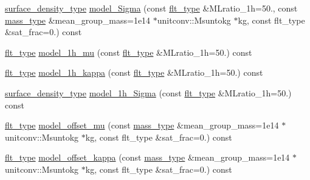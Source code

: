 \begin{DoxyCompactItemize}
\item 
\hyperlink{namespaceIceBRG_a80c597ef5ba0a32491d32a9f0083b02d}{surface\-\_\-density\-\_\-type} \hyperlink{classIceBRG_1_1pair__bin__summary_a1627a07bc392e0a876f5257b5b614622}{model\-\_\-\-Sigma} (const \hyperlink{lib_2IceBRG__main_2common_8h_ad0f130a56eeb944d9ef2692ee881ecc4}{flt\-\_\-type} \&M\-Lratio\-\_\-1h=50., const \hyperlink{namespaceIceBRG_a1be72ac4918a9b029f2eefa084213e35}{mass\-\_\-type} \&mean\-\_\-group\-\_\-mass=1e14 $\ast$unitconv\-::\-Msuntokg $\ast$kg, const flt\-\_\-type \&sat\-\_\-frac=0.) const 
\item 
\hyperlink{lib_2IceBRG__main_2common_8h_ad0f130a56eeb944d9ef2692ee881ecc4}{flt\-\_\-type} \hyperlink{classIceBRG_1_1pair__bin__summary_a1acf154add21e045b2b58cce9eeb0a14}{model\-\_\-1h\-\_\-mu} (const \hyperlink{lib_2IceBRG__main_2common_8h_ad0f130a56eeb944d9ef2692ee881ecc4}{flt\-\_\-type} \&M\-Lratio\-\_\-1h=50.) const 
\item 
\hyperlink{lib_2IceBRG__main_2common_8h_ad0f130a56eeb944d9ef2692ee881ecc4}{flt\-\_\-type} \hyperlink{classIceBRG_1_1pair__bin__summary_a94306f4cf7cec2c34473bc9898817d6e}{model\-\_\-1h\-\_\-kappa} (const \hyperlink{lib_2IceBRG__main_2common_8h_ad0f130a56eeb944d9ef2692ee881ecc4}{flt\-\_\-type} \&M\-Lratio\-\_\-1h=50.) const 
\item 
\hyperlink{namespaceIceBRG_a80c597ef5ba0a32491d32a9f0083b02d}{surface\-\_\-density\-\_\-type} \hyperlink{classIceBRG_1_1pair__bin__summary_a3e6d7987aadd12908687bc77d0eaed09}{model\-\_\-1h\-\_\-\-Sigma} (const \hyperlink{lib_2IceBRG__main_2common_8h_ad0f130a56eeb944d9ef2692ee881ecc4}{flt\-\_\-type} \&M\-Lratio\-\_\-1h=50.) const 
\item 
\hyperlink{lib_2IceBRG__main_2common_8h_ad0f130a56eeb944d9ef2692ee881ecc4}{flt\-\_\-type} \hyperlink{classIceBRG_1_1pair__bin__summary_a1b4ff7d510022de3c9c6d5794db7ea98}{model\-\_\-offset\-\_\-mu} (const \hyperlink{namespaceIceBRG_a1be72ac4918a9b029f2eefa084213e35}{mass\-\_\-type} \&mean\-\_\-group\-\_\-mass=1e14 $\ast$unitconv\-::\-Msuntokg $\ast$kg, const flt\-\_\-type \&sat\-\_\-frac=0.) const 
\item 
\hyperlink{lib_2IceBRG__main_2common_8h_ad0f130a56eeb944d9ef2692ee881ecc4}{flt\-\_\-type} \hyperlink{classIceBRG_1_1pair__bin__summary_a3f3053c2a1481739b1240dd383803f37}{model\-\_\-offset\-\_\-kappa} (const \hyperlink{namespaceIceBRG_a1be72ac4918a9b029f2eefa084213e35}{mass\-\_\-type} \&mean\-\_\-group\-\_\-mass=1e14 $\ast$unitconv\-::\-Msuntokg $\ast$kg, const flt\-\_\-type \&sat\-\_\-frac=0.) const 
\item 

\end{DoxyCompactItemize}
